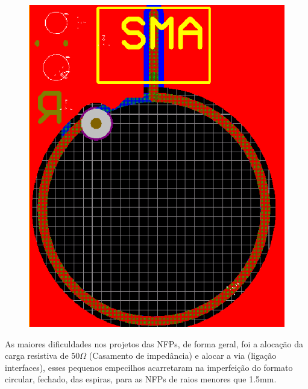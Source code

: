 \begin{figure}[htb!]
{		\includegraphics[scale=0.3]{./img/10B_layers}
		\label{fig:10B_layers}}
\end{figure}

As maiores dificuldades nos projetos das NFPs, de forma geral, foi a alocação da carga resistiva de $50\Omega$ (Casamento de impedância) e alocar a via (ligação interfaces), esses pequenos empecilhos acarretaram na imperfeição do formato circular, fechado, das espiras, para as NFPs de raios menores que 1.5mm.


